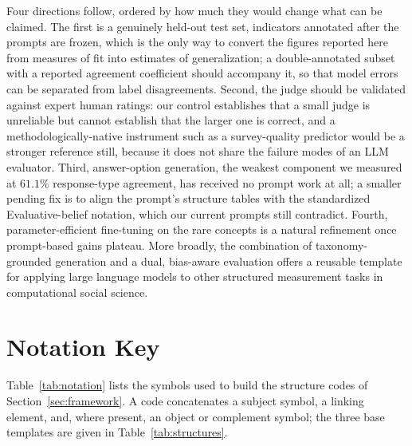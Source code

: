 \documentclass[onecolumn, 11pt]{IEEEtran}
\begin{document}
Four directions follow, ordered by how much they would change what can be claimed. The first is a genuinely held-out test set, indicators annotated after the prompts are frozen, which is the only way to convert the figures reported here from measures of fit into estimates of generalization; a double-annotated subset with a reported agreement coefficient should accompany it, so that model errors can be separated from label disagreements. Second, the judge should be validated against expert human ratings: our control establishes that a small judge is unreliable but cannot establish that the larger one is correct, and a methodologically-native instrument such as a survey-quality predictor would be a stronger reference still, because it does not share the failure modes of an LLM evaluator. Third, answer-option generation, the weakest component we measured at $61.1\%$ response-type agreement, has received no prompt work at all; a smaller pending fix is to align the prompt's structure tables with the standardized Evaluative-belief notation, which our current prompts still contradict. Fourth, parameter-efficient fine-tuning on the rare concepts is a natural refinement once prompt-based gains plateau. More broadly, the combination of taxonomy-grounded generation and a dual, bias-aware evaluation offers a reusable template for applying large language models to other structured measurement tasks in computational social science.

\appendices

\section{Notation Key}
\label{app:notation}
Table~\ref{tab:notation} lists the symbols used to build the structure codes of Section~\ref{sec:framework}. A code concatenates a subject symbol, a linking element, and, where present, an object or complement symbol; the three base templates are given in Table~\ref{tab:structures}.
\end{document}
